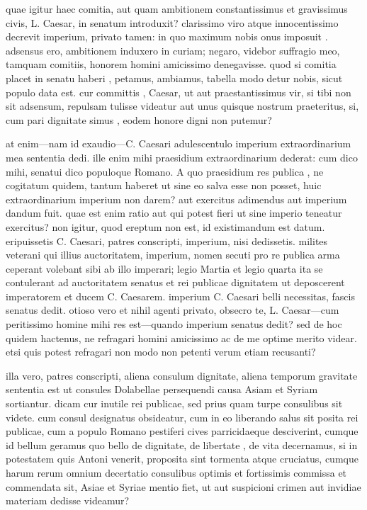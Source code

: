  quae igitur haec comitia, aut quam ambitionem constantissimus et gravissimus civis, L. Caesar, in senatum introduxit? clarissimo viro atque innocentissimo decrevit imperium, privato tamen: in quo maximum nobis onus imposuit . adsensus ero, ambitionem induxero in curiam; negaro, videbor suffragio meo, tamquam comitiis, honorem homini amicissimo denegavisse. quod si comitia placet in senatu haberi , petamus, ambiamus, tabella modo detur nobis, sicut populo data est. cur committis , Caesar, ut aut praestantissimus vir, si tibi non sit adsensum, repulsam tulisse videatur aut unus quisque nostrum praeteritus, si, cum pari dignitate simus , eodem honore digni non putemur?

 at enim—nam id exaudio—C. Caesari adulescentulo imperium extraordinarium mea sententia dedi. ille enim mihi praesidium extraordinarium dederat: cum dico mihi, senatui dico populoque Romano. A quo praesidium res publica , ne cogitatum quidem, tantum haberet ut sine eo salva esse non posset, huic extraordinarium imperium non darem? aut exercitus adimendus aut imperium dandum fuit. quae est enim ratio aut qui potest fieri ut sine imperio teneatur exercitus? non igitur, quod ereptum non est, id existimandum est datum. eripuissetis C. Caesari, patres conscripti, imperium, nisi dedissetis. milites veterani qui illius auctoritatem, imperium, nomen secuti pro re publica arma ceperant volebant sibi ab illo imperari; legio Martia et legio quarta ita se contulerant ad auctoritatem senatus et rei publicae dignitatem ut deposcerent imperatorem et ducem C. Caesarem. imperium C. Caesari belli necessitas, fascis senatus dedit. otioso vero et nihil agenti privato, obsecro te, L. Caesar—cum peritissimo homine mihi res est—quando imperium senatus dedit? sed de hoc quidem hactenus, ne refragari homini amicissimo ac de me optime merito videar. etsi quis potest refragari non modo non petenti verum etiam recusanti?

 illa vero, patres conscripti, aliena consulum dignitate, aliena temporum gravitate sententia est ut consules Dolabellae persequendi causa Asiam et Syriam sortiantur. dicam cur inutile rei publicae, sed prius quam turpe consulibus sit videte. cum consul designatus obsideatur, cum in eo liberando salus sit posita rei publicae, cum a populo Romano pestiferi cives parricidaeque desciverint, cumque id bellum geramus quo bello de dignitate, de libertate , de vita decernamus, si in potestatem quis Antoni venerit, proposita sint tormenta atque cruciatus, cumque harum rerum omnium decertatio consulibus optimis et fortissimis commissa et commendata sit, Asiae et Syriae mentio fiet, ut aut suspicioni crimen aut invidiae materiam dedisse videamur?


